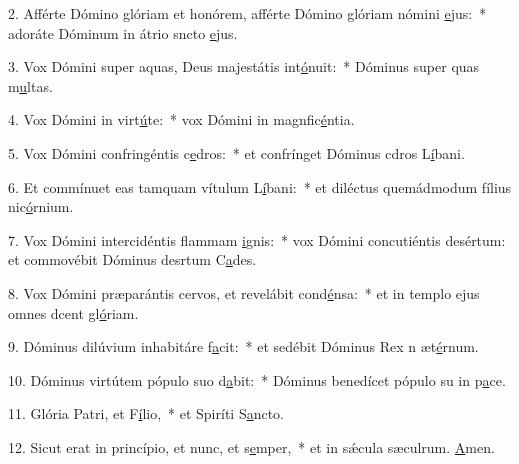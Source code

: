 2. Afférte Dómino glóriam et honórem, afférte Dómino glóriam nómini \uline{e}jus:~* adoráte Dóminum in átrio sncto \uline{e}jus.\par 
3. Vox Dómini super aquas, Deus majestátis int\uline{ó}nuit:~* Dóminus super quas m\uline{u}ltas.\par 
4. Vox Dómini in virt\uline{ú}te:~* vox Dómini in magnfic\uline{é}ntia.\par 
5. Vox Dómini confringéntis c\uline{e}dros:~* et confrínget Dóminus cdros L\uline{í}bani.\par 
6. Et commínuet eas tamquam vítulum L\uline{í}bani:~* et diléctus quemádmodum fílius nic\uline{ó}rnium.\par 
7. Vox Dómini intercidéntis flammam \uline{i}gnis:~* vox Dómini concutiéntis desértum: et commovébit Dóminus desrtum C\uline{a}des.\par 
8. Vox Dómini præparántis cervos, et revelábit cond\uline{é}nsa:~* et in templo ejus omnes dcent gl\uline{ó}riam.\par 
9. Dóminus dilúvium inhabitáre f\uline{a}cit:~* et sedébit Dóminus Rex n æt\uline{é}rnum.\par 
10. Dóminus virtútem pópulo suo d\uline{a}bit:~* Dóminus benedícet pópulo su in p\uline{a}ce.\par 
11. Glória Patri, et F\uline{í}lio,~* et Spiríti S\uline{a}ncto.\par 
12. Sicut erat in princípio, et nunc, et s\uline{e}mper,~* et in sǽcula sæculrum. \uline{A}men.\par 
